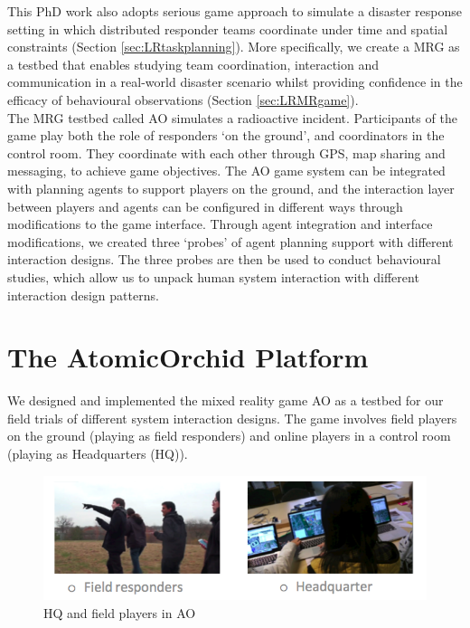 This PhD work also adopts serious game approach to simulate a disaster response setting in which distributed responder teams coordinate under time and spatial constraints (Section \ref{sec:LRtaskplanning}). More specifically, we create a \acf{MRG} as a testbed that enables studying team coordination, interaction and communication in a real-world disaster scenario whilst providing confidence in the efficacy of behavioural observations (Section \ref{sec:LRMRgame}).\\

The \ac{MRG} testbed called \acf{AO} simulates a radioactive incident. Participants of the game play both the role of responders `on the ground', and coordinators in the control room. They coordinate with each other through GPS, map sharing and messaging, to achieve game objectives. The \ac{AO} game system can be integrated with planning agents to support players on the ground, and the interaction layer between players and agents can be configured in different ways through modifications to the game interface. Through agent integration and interface modifications, we created three `probes' of agent planning support with different interaction designs. The three probes are then be used to conduct behavioural studies, which allow us to unpack human system interaction with different interaction design patterns.\\

\section{The AtomicOrchid Platform}\label{sec:AOdescription}
We designed and implemented the mixed reality game \acf{AO} as a testbed for our field trials of different system interaction designs. The game involves field players on the ground (playing as field responders) and online players in a control room (playing as Headquarters (HQ)).

\begin{figure}[h]
  \centering
  \includegraphics[width=1\textwidth]{img/approach/GameComponents}
  \caption{HQ and field players in AO}
  \label{fig:AOroles}
\end{figure}

